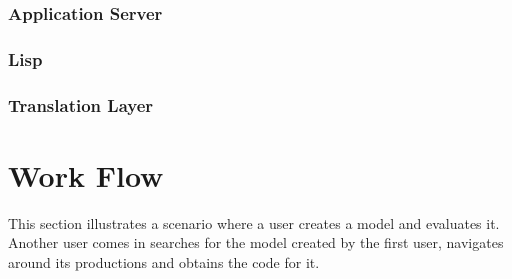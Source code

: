 
\subsubsection{Application Server}


\subsubsection{Lisp}


\subsubsection{Translation Layer}



\section{Work Flow}

This section illustrates a scenario where a user creates a model and
evaluates it. Another user comes in searches for the model created by
the first user, navigates around its productions and obtains the code for
it. 

